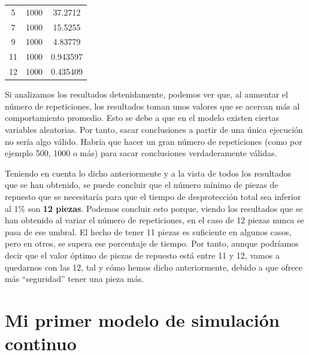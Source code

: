 \documentclass[11pt,a4paper]{report}
\begin{document}
\begin{longtable}{c|c|c}
5                                                                        & 1000                        & 37.2712                                                                                    \\
7                                                                        & 1000                        & 15.5255                                                                                    \\
9                                                                        & 1000                        & 4.83779                                                                                    \\
11                                                                       & 1000                        & 0.943597                                                                                   \\
12                                                                       & 1000                        & 0.435409       
\end{longtable}

Si analizamos los resultados detenidamente, podemos ver que, al aumentar el número de repeticiones, los resultados
toman unos valores que se acercan más al comportamiento promedio. Esto se debe a que en el modelo existen ciertas
variables aleatorias. Por tanto, sacar conclusiones a partir de una única ejecución no sería algo válido. Habría
que hacer un gran número de repeticiones (como por ejemplo 500, 1000 o más) para sacar conclusiones verdaderamente válidas.

Teniendo en cuenta lo dicho anteriormente y a la vista de todos los resultados que se han obtenido,
se puede concluir que el número mínimo de piezas de repuesto que se necesitaría para que el
tiempo de desprotección total sea inferior al 1\% son \textbf{12 piezas}. Podemos concluir esto porque, viendo
los resultados que se han obtenido al variar el número de repeticiones, en el caso de 12 piezas nunca se pasa de ese
umbral. El hecho de tener 11 piezas es suficiente en algunos casos, pero en otros, se supera ese porcentaje de tiempo.
Por tanto, aunque podríamos decir que el valor óptimo de piezas de repuesto está entre 11 y 12, vamos a quedarnos con
las 12, tal y cómo hemos dicho anteriormente, debido a que ofrece más ``seguridad'' tener una pieza más.



\newpage

\chapter{Mi primer modelo de simulación continuo}
\end{document}
